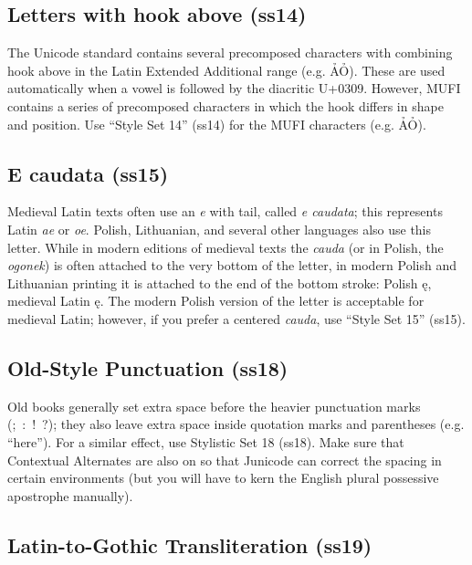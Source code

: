 \documentclass[12pt,a4paper,openany]{book}
\begin{document}
\subsection*{Letters with hook above (ss14)}

The Unicode standard contains several precomposed characters with
combining hook above in the Latin Extended Additional range
(e.g. ẢỎ). These are used automatically when a vowel is followed by
the diacritic U+0309. However, MUFI contains a series of precomposed
characters in which the hook differs in shape and position. Use “Style
Set 14” (ss14) for the MUFI characters (e.g.
ẢỎ).

\subsection*{E caudata (ss15)}

Medieval Latin texts often use an {\itshape e} with tail, called
{\itshape e caudata}; this represents Latin {\itshape ae} or {\itshape
  oe}. Polish, Lithuanian, and several other languages also use this
letter. While in modern editions of medieval texts the {\itshape
  cauda} (or in Polish, the {\itshape ogonek}) is often attached to
the very bottom of the letter, in modern Polish and Lithuanian
printing it is attached to the end of the bottom stroke: Polish ę,
medieval Latin {ę}. The modern
Polish version of the letter is acceptable for medieval Latin;
however, if you prefer a centered {\itshape cauda}, use
“Style Set 15” (ss15).

\subsection*{Old-Style Punctuation (ss18)}

{Old books generally set
extra space before the heavier punctuation marks (; : ! ?);
they also leave extra space inside quotation marks and
parentheses (e.g. “here”). For a similar effect, use Stylistic Set 18 (ss18). Make sure
that Contextual Alternates are also on so that Junicode can correct
the spacing in certain environments (but you will have to kern the English plural
possessive apostrophe manually).}

\subsection*{Latin-to-Gothic Transliteration (ss19)}
\end{document}
